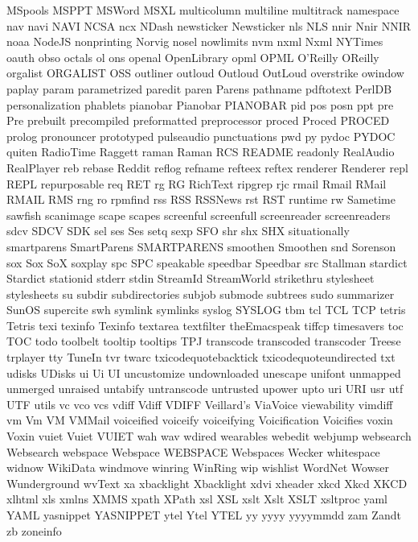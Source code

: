 MSpools
MSPPT
MSWord
MSXL
multicolumn
multiline
multitrack
namespace
nav
navi
NAVI
NCSA
ncx
NDash
newsticker
Newsticker
nls
NLS
nnir
Nnir
NNIR
noaa
NodeJS
nonprinting
Norvig
nosel
nowlimits
nvm
nxml
Nxml
NYTimes
oauth
obso
octals
ol
ons
openal
OpenLibrary
opml
OPML
O'Reilly
OReilly
orgalist
ORGALIST
OSS
outliner
outloud
Outloud
OutLoud
overstrike
owindow
paplay
param
parametrized
paredit
paren
Parens
pathname
pdftotext
PerlDB
personalization
phablets
pianobar
Pianobar
PIANOBAR
pid
pos
posn
ppt
pre
Pre
prebuilt
precompiled
preformatted
preprocessor
proced
Proced
PROCED
prolog
pronouncer
prototyped
pulseaudio
punctuations
pwd
py
pydoc
PYDOC
quiten
RadioTime
Raggett
raman
Raman
RCS
README
readonly
RealAudio
RealPlayer
reb
rebase
Reddit
reflog
refname
refteex
reftex
renderer
Renderer
repl
REPL
repurposable
req
RET
rg
RG
RichText
ripgrep
rjc
rmail
Rmail
RMail
RMAIL
RMS
rng
ro
rpmfind
rss
RSS
RSSNews
rst
RST
runtime
rw
Sametime
sawfish
scanimage
scape
scapes
screenful
screenfull
screenreader
screenreaders
sdcv
SDCV
SDK
sel
ses
Ses
setq
sexp
SFO
shr
shx
SHX
situationally
smartparens
SmartParens
SMARTPARENS
smoothen
Smoothen
snd
Sorenson
sox
Sox
SoX
soxplay
spc
SPC
speakable
speedbar
Speedbar
src
Stallman
stardict
Stardict
stationid
stderr
stdin
StreamId
StreamWorld
strikethru
stylesheet
stylesheets
su
subdir
subdirectories
subjob
submode
subtrees
sudo
summarizer
SunOS
supercite
swh
symlink
symlinks
syslog
SYSLOG
tbm
tcl
TCL
TCP
tetris
Tetris
texi
texinfo
Texinfo
textarea
textfilter
theEmacspeak
tiffcp
timesavers
toc
TOC
todo
toolbelt
tooltip
tooltips
TPJ
transcode
transcoded
transcoder
Treese
trplayer
tty
TuneIn
tvr
twarc
txicodequotebacktick
txicodequoteundirected
txt
udisks
UDisks
ui
Ui
UI
uncustomize
undownloaded
unescape
unifont
unmapped
unmerged
unraised
untabify
untranscode
untrusted
upower
upto
uri
URI
usr
utf
UTF
utils
vc
vco
vcs
vdiff
Vdiff
VDIFF
Veillard's
ViaVoice
viewability
vimdiff
vm
Vm
VM
VMMail
voiceified
voiceify
voiceifying
Voicification
Voicifies
voxin
Voxin
vuiet
Vuiet
VUIET
wah
wav
wdired
wearables
webedit
webjump
websearch
Websearch
webspace
Webspace
WEBSPACE
Webspaces
Wecker
whitespace
widnow
WikiData
windmove
winring
WinRing
wip
wishlist
WordNet
Wowser
Wunderground
wvText
xa
xbacklight
Xbacklight
xdvi
xheader
xkcd
Xkcd
XKCD
xlhtml
xls
xmlns
XMMS
xpath
XPath
xsl
XSL
xslt
Xslt
XSLT
xsltproc
yaml
YAML
yasnippet
YASNIPPET
ytel
Ytel
YTEL
yy
yyyy
yyyymmdd
zam
Zandt
zb
zoneinfo
